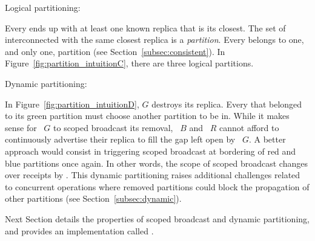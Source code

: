 \begin{asparadesc}
\item [Logical partitioning:]

Every \process ends up with at least one known replica that is its
closest. The set of interconnected \processes with the same closest
replica is a \emph{partition}. Every \process belongs to one, and only
one, partition (see Section~\ref{subsec:consistent}).
In Figure~\ref{fig:partition_intuitionC}, there are three logical partitions.


\item [Dynamic partitioning:]

In Figure~\ref{fig:partition_intuitionD}, \Process $G$ destroys its
replica. Every \process that belonged to its green partition must
choose another partition to be in. While it makes sense for
\Process~$G$ to scoped broadcast its removal, \Process~$B$ and
\Process~$R$ cannot afford to continuously advertise their replica to
fill the gap left open by \Process~$G$. A better approach would
consist in triggering scoped broadcast at bordering \processes of red
and blue partitions once again. In other words, the scope of scoped broadcast changes
over receipts by \processes. This dynamic partitioning raises additional
challenges related to concurrent operations where removed partitions
could block the propagation of other partitions (see
Section~\ref{subsec:dynamic}).

  

\end{asparadesc}

Next Section details the properties of scoped broadcast and dynamic
partitioning, %
and provides an implementation called \NAME.%


